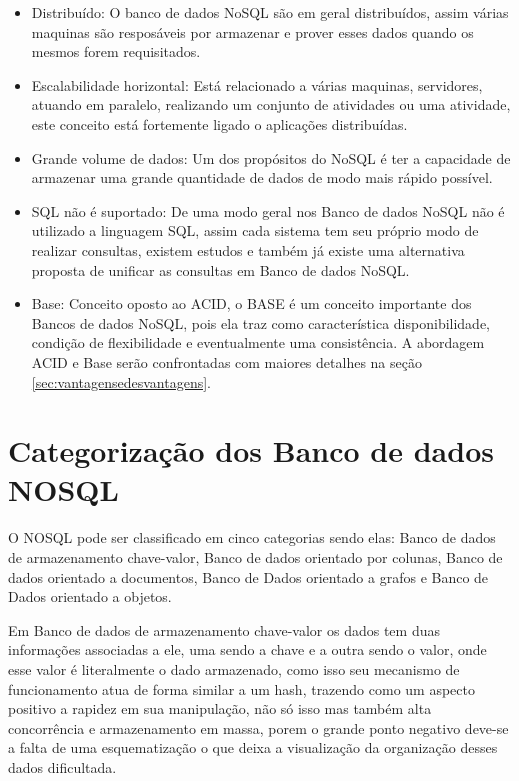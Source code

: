 \documentclass[12pt]{article}
\begin{document}
\begin{itemize}
	\item Distribuído: O banco de dados NoSQL são em geral distribuídos, assim várias maquinas são resposáveis por armazenar e prover esses dados quando os mesmos forem requisitados.\\
	\item Escalabilidade horizontal: Está relacionado a várias maquinas, servidores, atuando em paralelo, realizando um conjunto de atividades ou uma atividade, este conceito está fortemente ligado o aplicações distribuídas. \\
	\item Grande volume de dados: Um dos propósitos do NoSQL é ter a capacidade de armazenar uma grande quantidade de dados de modo mais rápido possível.\\
	\item SQL não é suportado: De uma modo geral nos Banco de dados NoSQL não é utilizado a linguagem SQL, assim cada sistema tem seu próprio modo de realizar consultas, existem estudos e também já existe uma alternativa proposta de unificar as consultas em Banco de dados NoSQL.\\
	\item Base: Conceito oposto ao ACID, o BASE é um conceito importante dos Bancos de dados NoSQL, pois ela traz como característica disponibilidade, condição de flexibilidade e eventualmente uma consistência. A abordagem ACID e Base serão confrontadas com maiores detalhes na seção \ref{sec:vantagensedesvantagens}.
\end{itemize}

\section{Categorização dos Banco de dados NOSQL}
\label{sec:categorizacao}

O NOSQL pode ser classificado em cinco categorias \cite{typeNOSQL:2013} sendo elas: Banco de dados de armazenamento chave-valor, Banco de dados orientado por colunas, Banco de dados orientado a documentos, Banco de Dados orientado a grafos e Banco de Dados orientado a objetos.

Em Banco de dados de armazenamento chave-valor os dados tem duas informações associadas a ele, uma sendo a chave e a outra sendo o valor, onde esse valor é literalmente o dado armazenado, como isso seu mecanismo de funcionamento atua de forma similar a um hash, trazendo como um aspecto positivo a rapidez em sua manipulação, não só isso mas também alta concorrência e armazenamento em massa, porem o grande ponto negativo deve-se a falta de uma esquematização o que deixa a visualização da organização desses dados dificultada.\cite{typeNOSQL:2013}
\end{document}
